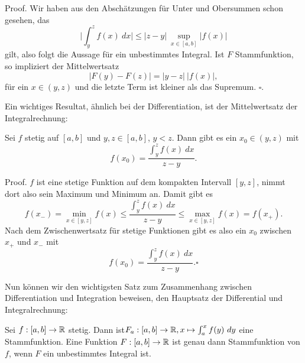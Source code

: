 \begin{emphBox}{}{}
Proof. Wir haben aus den Abschätzungen für Unter  und Obersummen schon gesehen, das
\begin{equation*}
 \vert \int_y^z f(x)~dx \vert \leq \vert z -y \vert ~\sup_{x \in [a,b]} \vert f(x) \vert
\end{equation*}
gilt, also folgt die Aussage für ein unbestimmtes Integral. Ist \(F\) Stammfunktion, so impliziert der Mittelwertsatz
\begin{equation*}
 \vert F(y) - F(z) \vert = \vert y - z \vert ~\vert f(x) \vert,
\end{equation*}
für ein \(x \in (y,z)\) und die letzte Term ist kleiner als das Supremum. \(\square\).
\end{emphBox}

Ein wichtiges Resultat, ähnlich bei der Differentiation, ist der Mittelwertsatz der Integralrechnung:
\label{integration/hdi:theorem-2}
\begin{theorem}{}{}



Sei \(f\) stetig auf \([a,b]\) und \(y,z \in [a,b]\), \(y < z\). Dann gibt es ein \(x_0 \in (y,z)\) mit
\begin{equation*}
 f(x_0) = \frac{\int_y^z f(x)~dx}{z-y}.
\end{equation*}\end{theorem}

\begin{emphBox}{}{}
Proof. \(f\) ist eine stetige Funktion auf dem kompakten Intervall \([y,z]\), nimmt dort also sein Maximum und Minimum an. Damit gibt es
\begin{equation*}
 f(x_-) = \min_{x \in [y,z]} f(x) \leq \frac{\int_y^z f(x)~dx}{z-y} \leq  \max_{x \in [y,z]} f(x) = f(x_+).
\end{equation*}
Nach dem Zwischenwertsatz für stetige Funktionen gibt es also ein \(x_0\) zwischen \(x_+\) und \(x_-\) mit
\begin{equation*}
 f(x_0) = \frac{\int_y^z f(x)~dx}{z-y}. \square
\end{equation*}\end{emphBox}

Nun können wir den wichtigsten Satz zum Zusammenhang zwischen Differentiation und Integration beweisen, den Hauptsatz der Differential  und Integralrechnung:
\label{integration/hdi:theorem-3}
\begin{theorem}{}{}



Sei \(f:[a,b] \rightarrow \mathbb{R}\) stetig. Dann ist\(F_a: [a,b] \rightarrow \mathbb{R}, x \mapsto \int_a^x f(y)~dy\)
eine Stammfunktion. Eine Funktion \(F:[a,b] \rightarrow \mathbb{R}\) ist genau dann Stammfunktion von \(f\), wenn \(F\) ein unbestimmtes Integral ist.
\end{theorem}

